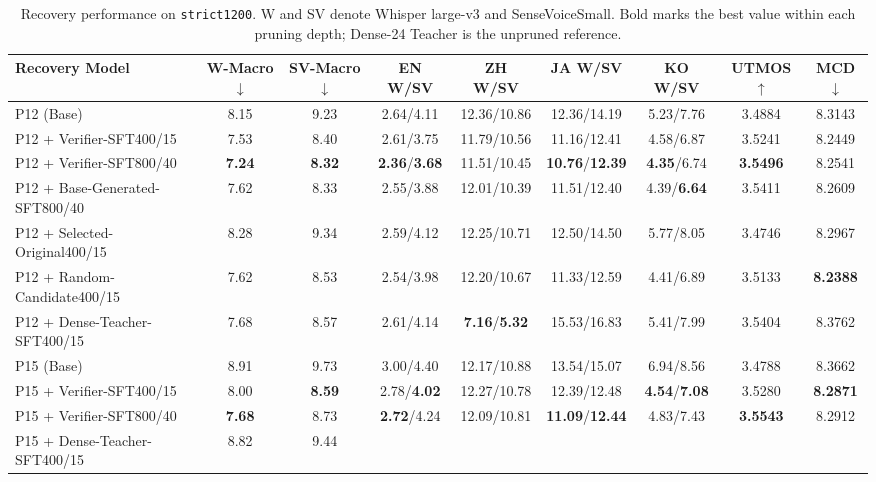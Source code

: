 \documentclass{article}
\begin{document}
\begin{table}[!t]
\centering
\caption{Recovery performance on \texttt{strict1200}.
W and SV denote Whisper large-v3 and SenseVoiceSmall.
Bold marks the best value within each pruning depth;
Dense-24 Teacher is the unpruned reference.}
\label{tab:recovery_results}
\small
\setlength{\tabcolsep}{3pt}
\renewcommand{\arraystretch}{1.05}
\begin{tabular}{lcccccccc}
\toprule
\textbf{Recovery Model} & \textbf{W-Macro$\downarrow$} &
\textbf{SV-Macro$\downarrow$} &
\textbf{EN W/SV} & \textbf{ZH W/SV} & \textbf{JA W/SV} &
\textbf{KO W/SV} & \textbf{UTMOS$\uparrow$} & \textbf{MCD$\downarrow$} \\
\midrule
P12 (Base) & 8.15 & 9.23 &
2.64/4.11 & 12.36/10.86 & 12.36/14.19 & 5.23/7.76 & 3.4884 & 8.3143 \\
P12 + Verifier-SFT400/15 & 7.53 & 8.40 &
2.61/3.75 & 11.79/10.56 & 11.16/12.41 & 4.58/6.87 & 3.5241 & 8.2449 \\
P12 + Verifier-SFT800/40 & \textbf{7.24} & \textbf{8.32} &
\textbf{2.36}/\textbf{3.68} & 11.51/10.45 & \textbf{10.76}/\textbf{12.39} & \textbf{4.35}/6.74 & \textbf{3.5496} & 8.2541 \\
P12 + Base-Generated-SFT800/40 & 7.62 & 8.33 &
2.55/3.88 & 12.01/10.39 & 11.51/12.40 & 4.39/\textbf{6.64} & 3.5411 & 8.2609 \\
P12 + Selected-Original400/15 & 8.28 & 9.34 &
2.59/4.12 & 12.25/10.71 & 12.50/14.50 & 5.77/8.05 & 3.4746 & 8.2967 \\
P12 + Random-Candidate400/15 & 7.62 & 8.53 &
2.54/3.98 & 12.20/10.67 & 11.33/12.59 & 4.41/6.89 & 3.5133 & \textbf{8.2388} \\
P12 + Dense-Teacher-SFT400/15 & 7.68 & 8.57 &
2.61/4.14 & \textbf{7.16}/\textbf{5.32} & 15.53/16.83 & 5.41/7.99 & 3.5404 & 8.3762 \\
\addlinespace
P15 (Base) & 8.91 & 9.73 &
3.00/4.40 & 12.17/10.88 & 13.54/15.07 & 6.94/8.56 & 3.4788 & 8.3662 \\
P15 + Verifier-SFT400/15 & 8.00 & \textbf{8.59} &
2.78/\textbf{4.02} & 12.27/10.78 & 12.39/12.48 & \textbf{4.54}/\textbf{7.08} & 3.5280 & \textbf{8.2871} \\
P15 + Verifier-SFT800/40 & \textbf{7.68} & 8.73 &
\textbf{2.72}/4.24 & 12.09/10.81 & \textbf{11.09}/\textbf{12.44} & 4.83/7.43 & \textbf{3.5543} & 8.2912 \\
P15 + Dense-Teacher-SFT400/15 & 8.82 & 9.44 &

\end{tabular}
\end{table}
\end{document}
